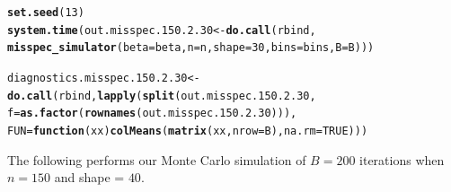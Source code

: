 \documentclass[11pt]{article}\usepackage[]{graphicx}\usepackage[]{color}
\makeatletter
\newcommand{\hlnum}[1]{\textcolor[rgb]{0.686,0.059,0.569}{#1}}%
\newcommand{\hlstd}[1]{\textcolor[rgb]{0.345,0.345,0.345}{#1}}%
\newcommand{\hlkwa}[1]{\textcolor[rgb]{0.161,0.373,0.58}{\textbf{#1}}}%
\newcommand{\hlkwb}[1]{\textcolor[rgb]{0.69,0.353,0.396}{#1}}%
\newcommand{\hlkwc}[1]{\textcolor[rgb]{0.333,0.667,0.333}{#1}}%
\newcommand{\hlkwd}[1]{\textcolor[rgb]{0.737,0.353,0.396}{\textbf{#1}}}%
\newenvironment{kframe}{%
 \def\at@end@of@kframe{}%
 \ifinner\ifhmode%
  \def\at@end@of@kframe{\end{minipage}}%
  \begin{minipage}{\columnwidth}%
 \fi\fi%
 \def\FrameCommand##1{\hskip\@totalleftmargin \hskip-\fboxsep
 \colorbox{shadecolor}{##1}\hskip-\fboxsep
     \hskip-\linewidth \hskip-\@totalleftmargin \hskip\columnwidth}%
 \MakeFramed {\advance\hsize-\width
   \@totalleftmargin\z@ \linewidth\hsize
   \@setminipage}}%
 {\par\unskip\endMakeFramed%
 \at@end@of@kframe}
\newenvironment{knitrout}{}{} %
\makeatother
\begin{document}
\begin{knitrout}
\color{fgcolor}\begin{kframe}
\begin{alltt}
\hlkwd{set.seed}\hlstd{(}\hlnum{13}\hlstd{)}
\hlkwd{system.time}\hlstd{(out.misspec.150.2.30} \hlkwb{<-} \hlkwd{do.call}\hlstd{(rbind,}
  \hlkwd{misspec_simulator}\hlstd{(}\hlkwc{beta} \hlstd{= beta,} \hlkwc{n} \hlstd{= n,} \hlkwc{shape} \hlstd{=} \hlnum{30}\hlstd{,} \hlkwc{bins} \hlstd{= bins,} \hlkwc{B} \hlstd{= B)))}
\end{alltt}


{\ttfamily\noindent\bfseries\color{errorcolor}{\#\# Error in chol.default(crossprod(x) + lambda[j] * diag(v)): the leading minor of order 5 is not positive definite}}

{\ttfamily\noindent\itshape\color{messagecolor}{\#\# Timing stopped at: 0.656 0 0.656}}\begin{alltt}
\hlstd{diagnostics.misspec.150.2.30} \hlkwb{<-} \hlkwd{do.call}\hlstd{(rbind,} \hlkwd{lapply}\hlstd{(}\hlkwd{split}\hlstd{(out.misspec.150.2.30,}
  \hlkwc{f} \hlstd{=} \hlkwd{as.factor}\hlstd{(}\hlkwd{rownames}\hlstd{(out.misspec.150.2.30))),}
  \hlkwc{FUN} \hlstd{=} \hlkwa{function}\hlstd{(}\hlkwc{xx}\hlstd{)} \hlkwd{colMeans}\hlstd{(}\hlkwd{matrix}\hlstd{(xx,} \hlkwc{nrow} \hlstd{= B),} \hlkwc{na.rm} \hlstd{=} \hlnum{TRUE}\hlstd{)))}
\end{alltt}


{\ttfamily\noindent\bfseries\color{errorcolor}{\#\# Error in split(out.misspec.150.2.30, f = as.factor(rownames(out.misspec.150.2.30))): object 'out.misspec.150.2.30' not found}}\end{kframe}
\end{knitrout}


The following performs our Monte Carlo simulation of $B = 200$ iterations 
when $n = 150$ and shape = $40$.
\end{document}
